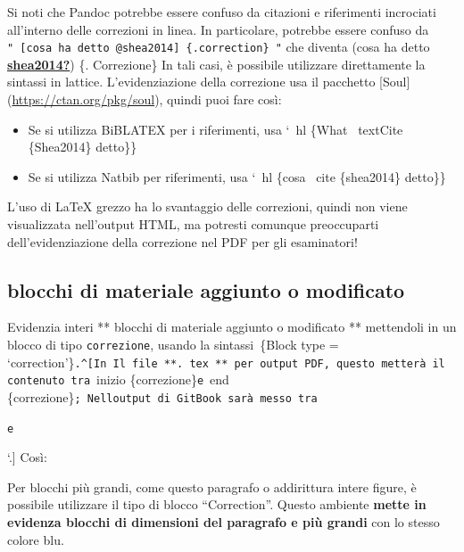 \documentclass[a4paper, 11pt, nobind]{templates/ociamthesis}
\providecommand{\tightlist}{%
  \setlength{\itemsep}{0pt}\setlength{\parskip}{0pt}}
\begin{document}
Si noti che Pandoc potrebbe essere confuso da citazioni e riferimenti incrociati all'interno delle correzioni in linea.
In particolare, potrebbe essere confuso da \texttt{"\ {[}cosa\ ha\ detto\ @shea2014{]}\ \{.correction\}\ "} che diventa (cosa ha detto \protect\hyperlink{ref-shea2014}{\textbf{shea2014?}}) \{. Correzione\}
In tali casi, è possibile utilizzare direttamente la sintassi in lattice.
L'evidenziazione della correzione usa il pacchetto {[}Soul{]} (\url{https://ctan.org/pkg/soul}), quindi puoi fare così:

\begin{itemize}
\tightlist
\item
  Se si utilizza BiBLATEX per i riferimenti, usa `~hl \{What ~textCite \{Shea2014\} detto\}\}
\item
  Se si utilizza Natbib per riferimenti, usa `~hl \{cosa ~cite \{shea2014\} detto\}\}
\end{itemize}

L'uso di LaTeX grezzo ha lo svantaggio delle correzioni, quindi non viene visualizzata nell'output HTML, ma potresti comunque preoccuparti dell'evidenziazione della correzione nel PDF per gli esaminatori!

\hypertarget{blocchi-di-materiale-aggiunto-o-modificato}{%
\subsection{blocchi di materiale aggiunto o modificato}\label{blocchi-di-materiale-aggiunto-o-modificato}}

Evidenzia interi ** blocchi di materiale aggiunto o modificato ** mettendoli in un blocco di tipo \texttt{correzione}, usando la sintassi\texttt{\textasciigrave{}\textasciigrave{}\ \textasciigrave{}\textasciigrave{}}\{Block type = `correction'\}\texttt{\textasciigrave{}\textasciigrave{}.\^{}{[}In\ Il\ file\ **.\ tex\ **\ per\ output\ PDF,\ questo\ metterà\ il\ contenuto\ tra}~inizio \{correzione\}\texttt{e}~end \{correzione\}\texttt{;\ Nell\textquotesingle{}output\ di\ GitBook\ sarà\ messo\ tra}

\texttt{e}

`.{]}
Così:

\begin{correction}
Per blocchi più grandi, come questo paragrafo o addirittura intere
figure, è possibile utilizzare il tipo di blocco ``Correction''. Questo
ambiente \textbf{mette in evidenza blocchi di dimensioni del paragrafo e
più grandi} con lo stesso colore blu.
\end{correction}
\end{document}
